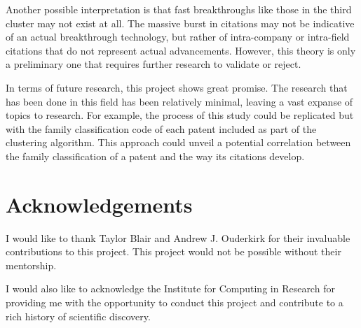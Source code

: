 Another possible interpretation is that fast breakthroughs like those in the third cluster may not exist at all. The massive burst in citations may not be indicative of an actual breakthrough technology, but rather of intra-company or intra-field citations that do not represent actual advancements. However, this theory is only a preliminary one that requires further research to validate or reject. 

In terms of future research, this project shows great promise. The research that has been done in this field has been relatively minimal, leaving a vast expanse of topics to research. For example, the process of this study could be replicated but with the family classification code of each patent included as part of the clustering algorithm. This approach could unveil a potential correlation between the family classification of a patent and the way its citations develop. 

\section{Acknowledgements}

I would like to thank Taylor Blair and Andrew J. Ouderkirk for their invaluable contributions to this project. This project would not be possible without their mentorship.

I would also like to acknowledge the Institute for Computing in Research for providing me with the opportunity to conduct this project and contribute to a rich history of scientific discovery. 











